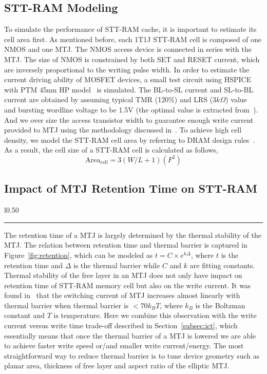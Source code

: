 \subsection{STT-RAM Modeling}
To simulate the performance of STT-RAM cache, it is important to estimate its cell area first. As mentioned before, each 1T1J STT-RAM cell is composed of one NMOS and one MTJ. The NMOS access device is connected in series with the MTJ. The size of NMOS is constrained by both SET and RESET current, which are inversely proportional to the writing pulse width. In order to estimate the current driving ability of MOSFET devices, a small test circuit using HSPICE with PTM 45nm HP model~\cite{PTM} is simulated. The BL-to-SL current and SL-to-BL current are obtained by assuming typical TMR (120\%) and LRS ($3k\Omega$) value~\cite{STTRAM:Qualcomm09} and bursting wordline voltage to be 1.5V (the optimal value is extracted from~\cite{STTRAM:Gatech10}). And we over size the access transistor width to guarantee enough write current provided to MTJ using the methodology discussed in~\cite{STTRAM:RPI10}. To achieve high cell density, we model the STT-RAM cell area by referring to DRAM design rules~\cite{DRAM:6F2}.  As a result, the cell size of a STT-RAM cell is calculated as follows,
\begin{equation}
\mathrm{Area}_{\mathrm{cell}}={3\left(W/L+1\right)}(F^2)
\end{equation}

\subsection{Impact of MTJ Retention Time on STT-RAM} \label{subsec:retention}
\begin{wrapfigure}{l}{0.50\textwidth}
\centering
 \hrule
 \caption{\label{fig:retention} \scriptsize \bf MTJ thermal stability requirement for different retention time}
\end{wrapfigure}

The retention time of a MTJ is largely determined by the thermal stability of the MTJ. The relation between retention time and thermal barrier is captured in Figure~\ref{fig:retention}, which can be modeled as $t=C\times e^{k\Delta}$, where $t$ is the retention time and $\Delta$ is the thermal barrier while $C$ and $k$ are fitting constants. Thermal stability of the free layer in an MTJ does not only have impact on retention time of STT-RAM memory cell but also on the write current. It was found in~\cite{PMTJ:Toshiba08} that the switching current of MTJ increases almost linearly with thermal barrier when thermal barrier is $<70k_{B}T$, where $k_{B}$ is the Boltzman constant and $T$ is temperature. Here we combine this observation with the write current versus write time trade-off described in Section~\ref{subsec:ict}, which essentially means that once the thermal barrier of a MTJ is lowered we are able to achieve faster write speed or/and smaller write current/energy. The most straightforward way to reduce thermal barrier is to tune device geometry such as planar area, thickness of free layer and aspect ratio of the elliptic MTJ.

